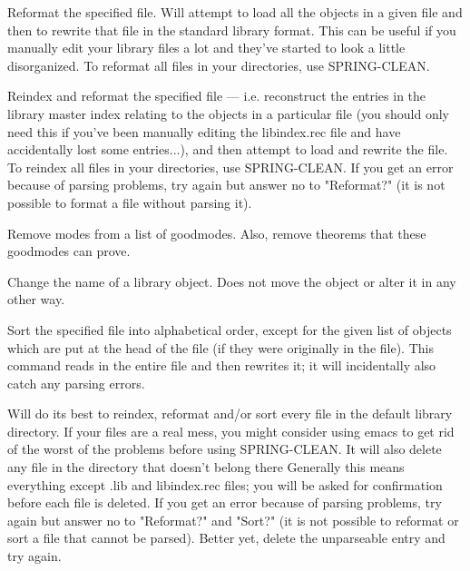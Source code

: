 \begin{description}
\item[REFORMAT]  
Reformat the specified file. Will attempt to load all the objects 
in a given file and then to rewrite that file in the standard library format.
This can be useful if you manually edit your library files a lot and they've 
started to look a little disorganized.
To reformat all files in your directories, use SPRING-CLEAN.

\item[REINDEX]  
Reindex and reformat the specified file --- i.e. reconstruct the 
entries in the library master index relating to the objects in a 
particular file (you should only need this if you've been manually editing 
the libindex.rec file and have accidentally lost some entries...), and then
attempt to load and rewrite the file.
To reindex all files in your directories, use SPRING-CLEAN.
If you get an error because of parsing problems, try again but answer
no to "Reformat?" (it is not possible to format a file without 
parsing it).

\item[REMOVE-GOODMODES]  
Remove modes from a list of goodmodes.  Also, remove theorems that these goodmodes can prove.

\item[RENAME-OBJECT]  
Change the name of a library object. Does not move the object or 
alter it in any other way.

\item[SORT]  
Sort the specified file into alphabetical order, except for the
given list of objects which are put at the head of the file (if they were 
originally in the file). This command reads in the entire file and then
rewrites it; it will incidentally also catch any parsing errors.

\item[SPRING-CLEAN]  
Will do its best to reindex, reformat and/or sort every file in the 
default library directory. If your files are a real mess, you might consider
using emacs to get rid of the worst of the problems before using SPRING-CLEAN.
It will also delete any file in the directory that doesn't belong there
Generally this means everything except .lib and libindex.rec files; you will be 
asked for confirmation before each file is deleted.
If you get an error because of parsing problems, try again but answer
no to "Reformat?" and "Sort?" (it is not possible to reformat or sort 
a file that cannot be parsed). Better yet, delete the unparseable entry and
try again.
\item
\end{description}

